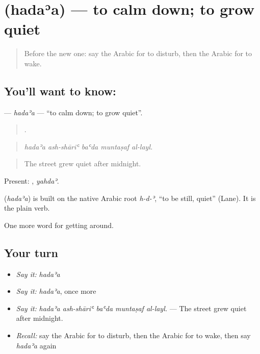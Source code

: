 \section[\texorpdfstring{\ar{هدأ} (hadaʾa)}{هدأ (hadaʾa)}]{ (hadaʾa) — to calm down; to grow quiet}

\label{lesson:AR-C448-hadaa}



\begin{quote}
Before the new one: say the Arabic for to disturb, then the Arabic for to wake.
\end{quote}

\subsection*{You'll want to know: }
\textbf{} — \emph{hadaʾa} — \textquotedblleft{}to calm down; to grow quiet\textquotedblright{}.

\begin{quote}
    .
\end{quote}

\begin{quote}
\emph{hadaʾa ash-shāriʿ baʿda muntaṣaf al-layl.}
\end{quote}

\begin{quote}
The street grew quiet after midnight.
\end{quote}

Present: , \emph{yahdaʾ}.

\begin{cousinweb}
\textbf{} (\emph{hadaʾa}) is built on the native Arabic root \emph{h-d-ʾ}, \textquotedblleft{}to be still, quiet\textquotedblright{} (Lane). It is the plain verb.
\end{cousinweb}

\begin{grammarlens}[title={What you've built}]
One more word for getting around.
\end{grammarlens}

\subsection*{Your turn}
\begin{itemize}
\raggedright
  \item \emph{Say it:} \emph{hadaʾa}
  \item \emph{Say it:} \emph{hadaʾa}, once more
  \item \emph{Say it:} \emph{hadaʾa ash-shāriʿ baʿda muntaṣaf al-layl.} — The street grew quiet after midnight.
  \item \emph{Recall:} say the Arabic for to disturb, then the Arabic for to wake, then say \emph{hadaʾa} again
\end{itemize}

